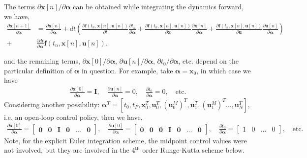 \documentclass[onecolumn,12pt]{article}
\newcommand{\bs}{\boldsymbol}
\begin{document}
The terms $\partial \bs x[n]/\partial \bs \alpha$ can be obtained while integrating the dynamics forward, we have, 
\begin{equation}
\begin{split}
\frac{\partial \bs x[n+1]}{\partial \bs \alpha} &= \frac{\partial \bs x[n]}{\partial \bs \alpha} + {d t} \left( \frac{\partial \bs f(t_n,\bs x[n], \bs u[n])}{\partial t}\frac{\partial t_n}{\partial \bs \alpha} + \frac{\partial \bs f(t_n,\bs x[n], \bs u[n])}{\partial \bs x}\frac{\partial \bs x[n]}{\partial \bs \alpha}  + \frac{\partial \bs f(t_n,\bs x[n], \bs u[n])}{\partial \bs u}\frac{\partial \bs u [n]}{\partial \bs \alpha}\right)  \\
+ & \frac{\partial dt}{\partial \bs \alpha}  \bs f(t_n,\bs x[n],\bs u[n]).
\end{split}
\label{eq:dxda}
\end{equation}

and the remaining terms, $\partial \bs x[0] /\partial\bs \alpha $, $\partial \bs u[n]/\partial \bs \alpha$, $\partial t_0 / \partial \bs \alpha$, etc. depend on the particular definition of $\bs \alpha$ in question. For example, take $\bs \alpha = \bs x_0$, in which case we have
\begin{align*}
\frac{\partial \bs x[0]}{\partial \bs \alpha} = \bs I, \quad  \frac{\partial \bs u[n]}{\partial \bs \alpha} = 0, \quad 
\frac{\partial t_0}{\partial \bs \alpha} =0, \quad \text{etc.}
\end{align*} 
Considering another possibility: $\bs \alpha^T = [t_0, t_F, \bs x_0^T, \bs u_0^T, (\bs u^M_0)^T, \bs u_1^T, (\bs u^M_1)^T ... , \bs u_N^T ]$, i.e. an open-loop control policy, then we have, 
\begin{align*}
\frac{\partial \bs x[0]}{\partial \bs \alpha} = 
\begin{bmatrix}
\bs 0 & \bs 0 & \bs I & \bs 0 & \dots & \bs 0
\end{bmatrix}, \quad  
\frac{\partial \bs u[0]}{\partial \bs \alpha} = 
\begin{bmatrix}
\bs 0 & \bs 0 & \bs 0 & \bs I & \bs 0 & \dots & \bs 0
\end{bmatrix}, \quad 
\frac{\partial t_0}{\partial \bs \alpha} =
\begin{bmatrix}
1 & 0 & \dots & 0 
\end{bmatrix}
, \quad \text{etc.}
\end{align*} 
Note, for the explicit Euler integration scheme, the midpoint control values were not involved, but they are involved in the 4$^{\text{th}}$ order Runge-Kutta scheme below.
\end{document}
